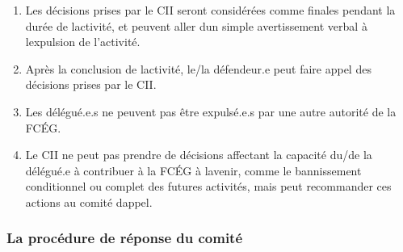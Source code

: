 \begin{enumerate}
 \item
  Les décisions prises par le CII seront considérées comme finales pendant la durée de l\textquotesingle activité, et peuvent aller d\textquotesingle un simple avertissement verbal à l\textquotesingle expulsion de l'activité.
 \item
  Après la conclusion de l\textquotesingle activité, le/la défendeur.e peut faire appel des décisions prises par le CII.
 \item
  Les délégué.e.s ne peuvent pas être expulsé.e.s par une autre autorité de la FCÉG.
 \item
  Le CII ne peut pas prendre de décisions affectant la capacité du/de la délégué.e à contribuer à la FCÉG à l\textquotesingle avenir, comme le bannissement conditionnel ou complet des futures activités, mais peut recommander ces actions au comité d\textquotesingle appel.
\end{enumerate}

\subsubsection{La procédure de réponse du comité}
\label{la-procedure-de-reponse-du-comite}


